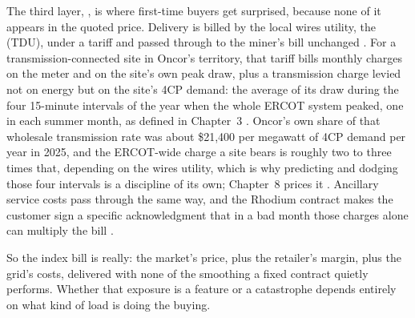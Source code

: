The third layer, , is where first-time buyers get surprised, because none of it appears in the quoted price. Delivery is billed by the local wires utility, the  (TDU), under a tariff and passed through to the miner's bill unchanged \autocite{rhodium2022indexcontract}. %
For a transmission-connected site in Oncor's territory, that tariff bills monthly charges on the meter and on the site's own peak draw, plus a transmission charge levied not on energy but on the site's 4CP demand: the average of its draw during the four 15-minute intervals of the year when the whole ERCOT system peaked, one in each summer month, as defined in Chapter~3 \autocite{oncor2026retailtariff}. %
Oncor's own share of that wholesale transmission rate was about \$21,400 per megawatt of 4CP demand per year in 2025, and the ERCOT-wide charge a site bears is roughly two to three times that, depending on the wires utility, which is why predicting and dodging those four intervals is a discipline of its own; Chapter~8 prices it \autocite{oncor2025transmissiontariff}. %
Ancillary service costs pass through the same way, and the Rhodium contract makes the customer sign a specific acknowledgment that in a bad month those charges alone can multiply the bill \autocite{rhodium2022indexcontract}. %

So the index bill is really: the market's price, plus the retailer's margin, plus the grid's costs, delivered with none of the smoothing a fixed contract quietly performs. Whether that exposure is a feature or a catastrophe depends entirely on what kind of load is doing the buying.


